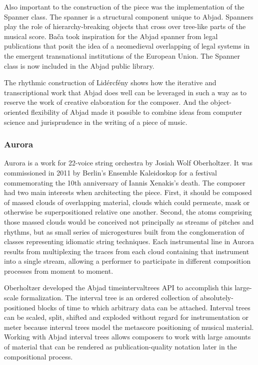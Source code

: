 Also important to the construction of the piece was the implementation of the Spanner class. The spanner is a structural component unique to Abjad. Spanners play the role of hierarchy-breaking objects that cross over tree-like parts of the musical score. Ba\v{c}a took inspiration for the Abjad spanner from legal publications that posit the idea of a neomedieval overlapping of legal systems in the emergent transnational institutions of the European Union. The Spanner class is now included in the Abjad public library.

The rhythmic construction of Lid\'{e}rcf\'{e}ny shows how the iterative and transcriptional work that Abjad does well can be leveraged in such a way as to reserve the work of creative elaboration for the composer. And the object-oriented flexibility of Abjad made it possible to combine ideas from computer science and jurisprudence in the writing of a piece of music.

\subsubsection{Aurora}
Aurora is a work for 22-voice string orchestra by Josiah Wolf Oberholtzer. It was commissioned in 2011 by Berlin’s Ensemble Kaleidoskop for a festival commemorating the 10th anniversary of Iannis Xenakis’s death. The composer had two main interests when architecting the piece. First, it should be composed of massed clouds of overlapping material, clouds which could permeate, mask or otherwise be superpositioned relative one another. Second, the atoms comprising those massed clouds would be conceived not principally as streams of pitches and rhythms, but as small series of microgestures built from the conglomeration of classes representing idiomatic string techniques. Each instrumental line in Aurora results from multiplexing the traces from each cloud containing that instrument into a single stream, allowing a performer to participate in different composition processes from moment to moment.

Oberholtzer developed the Abjad timeintervaltrees API to accomplish this large-scale formalization. The interval tree is an ordered collection of absolutely-positioned blocks of time to which arbitrary data can be attached. Interval trees can be scaled, split, shifted and exploded without regard for instrumentation or meter because interval trees model the metascore positioning of musical material. Working with Abjad interval trees allows composers to work with large amounts of material that can be rendered as publication-quality notation later in the compositional process.

